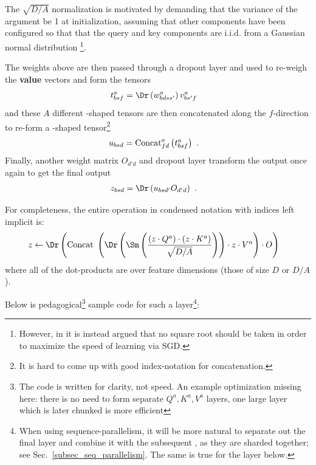 \documentclass[11pt]{article}
\begin{document}
The $ \sqrt{D/A} $ normalization is motivated by demanding
that the variance of the  argument be 1 at initialization, assuming that other
components have been configured so that that the query and key components are i.i.d. from a Gaussian
normal distribution \footnote{However, in \cite{yang2022tensor} it is instead argued that no square
	root should be taken in order to maximize the speed of learning via SGD.}.

The weights above are then passed through a dropout layer and used to re-weigh the \textbf{value} vectors and form the tensors
\begin{align}
	t ^{ a }_{ bsf } & =\Dr  \left (w ^{ a }_{ bdss' } \right ) v ^{ a }_{ bs'f }
	\label{eq_reweighted_values}
\end{align}
and these $ A $ different -shaped tensors
are then concatenated along the $ f $-direction to re-form a -shaped
tensor\footnote{It is hard to come up with good index-notation for concatenation.}
\begin{align}
	u _{ bsd } & = {\rm Concat}^{ a }_{ fd } \left ( t ^{ a }_{ bsf }\right )\ .
\end{align}
Finally, another weight matrix $ O _{d' d } $ and dropout layer transform the output once again to get the final
output
\begin{align}
	z _{ bsd } & = \Dr \left (u  _{ bsd' } O _{ d'd }\right )\ .
\end{align}

For completeness, the entire operation in condensed notation with indices left implicit is:
\begin{align}
	z & \leftarrow \Dr \left ({\rm Concat} \ \left ( \Dr \left (\Sm  \left ( \frac{ \left ( z \cdot Q ^{ a } \right )\cdot \left ( z \cdot K ^{ a } \right )}{ \sqrt{D/A} }
		\right)\right )\cdot z \cdot V ^{ a } \right ) \cdot O \right ) \label{eq_causal_attn}
\end{align}
where all of the dot-products are over feature dimensions (those of size $ D $ or $ D/A $).

Below is pedagogical\footnote{The
code is written for clarity, not speed. An example optimization missing here: there is no need to
form separate $ Q ^{ a },K ^{ a },V ^{ a} $  layers, one large layer which is later
chunked is more efficient} sample code for such a   layer\footnote{When
	using sequence-parallelism, it will be more natural to separate out the final  layer
	and combine it with the subsequent , as they are sharded together; see
	Sec.~\ref{subsec_seq_parallelism}. The same is true for the  layer below.}:
\end{document}

